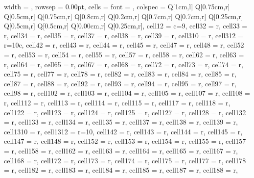 \begin{longtblr}[
  caption = {Linear model estimating all the considered metrics in every alternative scenario.}
]{
  width = \linewidth,
  rowsep = 0.00pt,
  cells   = {font = \fontsize{6}{7.2}\selectfont},
  colspec = {Q[1cm,l] Q[0.75cm,r] Q[0.5cm,r]  Q[0.75cm,r]  Q[0.8cm,r]  Q[0.2cm,r]  Q[0.7cm,r]  Q[0.7cm,r]  Q[0.25cm,r]  Q[0.5cm,r]  Q[0.5cm,r]  Q[0.00cm,r]  Q[0.25cm,r]},
  cell{1}{2} = {c=9}{},
  cell{3}{2} = {r},
  cell{3}{3} = {r},
  cell{3}{4} = {r},
  cell{3}{5} = {r},
  cell{3}{7} = {r},
  cell{3}{8} = {r},
  cell{3}{9} = {r},
  cell{3}{10} = {r},
  cell{3}{12} = {r=10}{c},
  cell{4}{2} = {r},
  cell{4}{3} = {r},
  cell{4}{4} = {r},
  cell{4}{5} = {r},
  cell{4}{7} = {r},
  cell{4}{8} = {r},
  cell{5}{2} = {r},
  cell{5}{3} = {r},
  cell{5}{4} = {r},
  cell{5}{5} = {r},
  cell{5}{7} = {r},
  cell{5}{8} = {r},
  cell{6}{2} = {r},
  cell{6}{3} = {r},
  cell{6}{4} = {r},
  cell{6}{5} = {r},
  cell{6}{7} = {r},
  cell{6}{8} = {r},
  cell{7}{2} = {r},
  cell{7}{3} = {r},
  cell{7}{4} = {r},
  cell{7}{5} = {r},
  cell{7}{7} = {r},
  cell{7}{8} = {r},
  cell{8}{2} = {r},
  cell{8}{3} = {r},
  cell{8}{4} = {r},
  cell{8}{5} = {r},
  cell{8}{7} = {r},
  cell{8}{8} = {r},
  cell{9}{2} = {r},
  cell{9}{3} = {r},
  cell{9}{4} = {r},
  cell{9}{5} = {r},
  cell{9}{7} = {r},
  cell{9}{8} = {r},
  cell{10}{2} = {r},
  cell{10}{3} = {r},
  cell{10}{4} = {r},
  cell{10}{5} = {r},
  cell{10}{7} = {r},
  cell{10}{8} = {r},
  cell{11}{2} = {r},
  cell{11}{3} = {r},
  cell{11}{4} = {r},
  cell{11}{5} = {r},
  cell{11}{7} = {r},
  cell{11}{8} = {r},
  cell{12}{2} = {r},
  cell{12}{3} = {r},
  cell{12}{4} = {r},
  cell{12}{5} = {r},
  cell{12}{7} = {r},
  cell{12}{8} = {r},
  cell{13}{2} = {r},
  cell{13}{3} = {r},
  cell{13}{4} = {r},
  cell{13}{5} = {r},
  cell{13}{7} = {r},
  cell{13}{8} = {r},
  cell{13}{9} = {r},
  cell{13}{10} = {r},
  cell{13}{12} = {r=10}{},
  cell{14}{2} = {r},
  cell{14}{3} = {r},
  cell{14}{4} = {r},
  cell{14}{5} = {r},
  cell{14}{7} = {r},
  cell{14}{8} = {r},
  cell{15}{2} = {r},
  cell{15}{3} = {r},
  cell{15}{4} = {r},
  cell{15}{5} = {r},
  cell{15}{7} = {r},
  cell{15}{8} = {r},
  cell{16}{2} = {r},
  cell{16}{3} = {r},
  cell{16}{4} = {r},
  cell{16}{5} = {r},
  cell{16}{7} = {r},
  cell{16}{8} = {r},
  cell{17}{2} = {r},
  cell{17}{3} = {r},
  cell{17}{4} = {r},
  cell{17}{5} = {r},
  cell{17}{7} = {r},
  cell{17}{8} = {r},
  cell{18}{2} = {r},
  cell{18}{3} = {r},
  cell{18}{4} = {r},
  cell{18}{5} = {r},
  cell{18}{7} = {r},
  cell{18}{8} = {r},
}
\end{longtblr}
